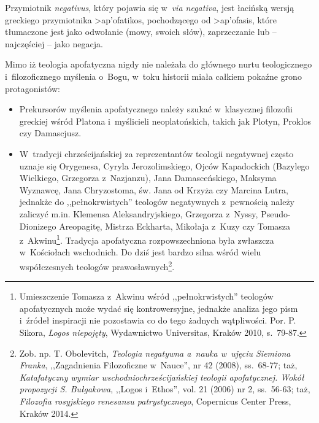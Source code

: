 Przymiotnik \textit{negativus}, który pojawia się w~\textit{via negativa}, jest łacińską wersją greckiego przymiotnika \textgreek{>ap'ofatikos}, pochodzącego od \textgreek{>ap'ofasis}, które tłumaczone jest jako odwołanie (mowy, swoich słów), zaprzeczanie lub -- najczęściej -- jako negacja.

Mimo iż teologia apofatyczna nigdy nie należała do głównego nurtu teologicznego i~filozoficznego myślenia o~Bogu, w~toku historii miała całkiem pokaźne grono protagonistów:

\begin{itemize}
\item Prekursorów myślenia apofatycznego należy szukać w~klasycznej filozofii greckiej wśród Platona i~myślicieli neoplatońskich, takich jak Plotyn, Proklos czy Damascjusz.
\item W~tradycji chrześcijańskiej za reprezentantów teologii negatywnej często uznaje się Orygenesa, Cyryla Jerozolimskiego, Ojców Kapadockich (Bazylego Wielkiego, Grzegorza z~Nazjanzu), Jana Damasceńskiego, Maksyma Wyznawcę, Jana Chryzostoma, św. Jana od Krzyża czy Marcina Lutra, jednakże do ,,pełnokrwistych'' teologów negatywnych z~pewnością należy zaliczyć m.in. Klemensa Aleksandryjskiego, Grzegorza z~Nyssy, Pseudo-Dionizego Areopagitę, Mistrza Eckharta, Mikołaja z~Kuzy czy Tomasza z~Akwinu\footnote{Umieszczenie Tomasza z~Akwinu wśród ,,pełnokrwistych'' teologów apofatycznych może wydać się kontrowersyjne, jednakże analiza jego pism i~źródeł inspiracji nie pozostawia co do tego żadnych wątpliwości. Por. P. Sikora, \textit{Logos niepojęty}, Wydawnictwo Universitas, Kraków 2010, s.~79-87.}. Tradycja apofatyczna rozpowszechniona była zwłaszcza w~Kościołach wschodnich. Do dziś jest bardzo silna wśród wielu współczesnych teologów prawosławnych\footnote{Zob. np. T. Obolevitch, \textit{Teologia negatywna a~nauka w~ujęciu Siemiona Franka}, ,,Zagadnienia Filozoficzne w~Nauce'', nr 42 (2008), ss.~68-77; taż, \textit{Katafatyczny wymiar wschodniochrześcijańskiej teologii apofatycznej. Wokół propozycji S. Bułgakowa}, ,,Logos i~Ethos'', vol. 21 (2006) nr 2, ss.~56-63; taż, \textit{Filozofia rosyjskiego renesansu patrystycznego}, Copernicus Center Press, Kraków 2014.}.

\end{itemize}
